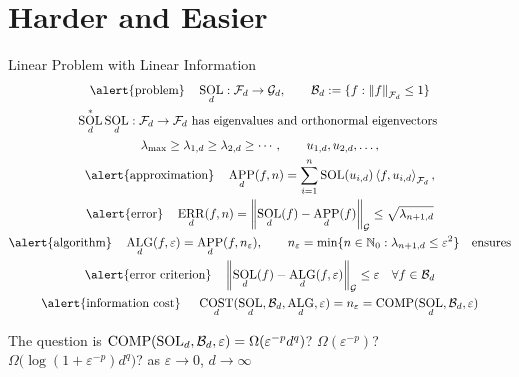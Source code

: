 \documentclass[11pt,compress,xcolor={usenames,dvipsnames},aspectratio=169]{beamer}
\DeclareMathOperator{\COMP}{COMP}
\DeclareMathOperator{\COST}{COST}
\DeclareMathOperator{\ALG}{ALG}
\DeclareMathOperator{\SOL}{SOL}
\DeclareMathOperator{\APP}{APP}
\DeclareMathOperator{\ERR}{ERR}
\begin{document}
\section{Harder and Easier}
\begin{frame}{Linear Problem with Linear Information}
    \vspace{-6ex}
   \begin{gather*}
   \text{\alert{problem}}\quad \SOL_d : \cf_d \to \cg_d,  \qquad \cb_d : = \{f : \norm[\cf_d]{f} \le 1 \} \\
   \SOL_d^*\SOL_d : \cf_d \to \cf_d \text{ has eigenvalues and orthonormal eigenvectors } \\
\lambda_{\max} \ge \lambda_{1,d} \ge \lambda_{2,d} \ge \cdots, \qquad u_{1,d}, u_{2,d}, \ldots, \\
   \text{\alert{approximation}\quad} \APP_d(f,n) = \sum_{i=1}^n \SOL(u_{i,d}) \ip[\cf_d]{f}{u_{i,d}}, \\
   \text{\alert{error}\quad}\ERR_d(f,n) = \norm[\cg]{\SOL_d(f) - \APP_d(f)} \le \sqrt{\lambda_{n+1, d}} \\
   \text{\alert{algorithm}\quad} \ALG_d(f,\varepsilon) = \APP_d(f,n_\varepsilon), \qquad n_\varepsilon = \min \{n \in \natzero : \lambda_{n+1, d} \le \varepsilon^2\} \quad \text{ensures}\\
   \text{\alert{error criterion}\quad} \norm[\cg]{\SOL_d(f) - \ALG_d(f,\varepsilon)} \le \varepsilon \quad \forall f \in \cb_d \\
   \text{\alert{information cost} \quad} \COST_d(\SOL_d,\cb_d,\ALG_d,\varepsilon) = n_\varepsilon = \COMP(\SOL_d,\cb_d,\varepsilon)
   \end{gather*}
   
   \vspace{-3ex}
   The question is $\COMP(\SOL_d,\cb_d,\varepsilon) = \Omega(\varepsilon^{-p} d^q)$? $\Omega(\varepsilon^{-p})$? \\
   \qquad \qquad $\Omega\bigl(\log(1 + \varepsilon^{-p} ) d^q \bigr)$?
   \hfill \hfill as $\varepsilon \to 0$, $d \to \infty$
   

\end{frame}
\end{document}
